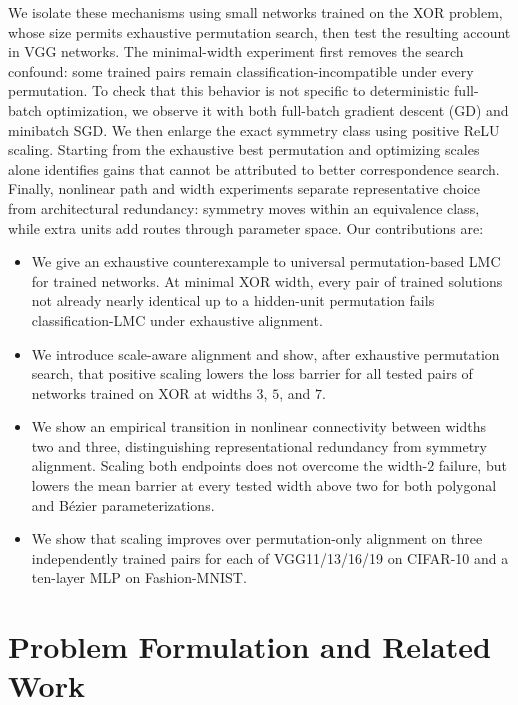 \documentclass[twoside]{article}
\begin{document}
\newpage
We isolate these mechanisms using small networks trained on the XOR problem,
whose size permits exhaustive permutation search, then test the resulting
account in VGG networks.  The
minimal-width experiment first removes the search confound: some trained pairs
remain classification-incompatible under every permutation.  To check that
this behavior is not specific to deterministic full-batch optimization, we
observe it with both full-batch gradient descent (GD) and minibatch SGD.  We then
enlarge the exact symmetry class using positive ReLU scaling.  Starting from
the exhaustive best permutation and optimizing scales alone identifies gains
that cannot be attributed to better correspondence search.  Finally, nonlinear
path and width experiments separate representative choice from architectural
redundancy: symmetry moves within an equivalence class, while extra units add
routes through parameter space.
Our contributions are:
\begin{itemize}
    \item We give an exhaustive counterexample to universal permutation-based
    LMC for trained networks.  At minimal XOR width, every pair of trained
    solutions not already nearly identical up to a hidden-unit permutation
    fails classification-LMC under exhaustive alignment.
    \item We introduce scale-aware alignment and show, after exhaustive
    permutation search, that positive scaling lowers the loss barrier for all
    tested pairs of networks trained on XOR at widths $3$, $5$, and $7$.
    \item We show an empirical transition in nonlinear connectivity between
    widths two and three, distinguishing representational redundancy from
    symmetry alignment.  Scaling both endpoints does not overcome the
    width-$2$ failure, but lowers the mean barrier at every tested width above
    two for both polygonal and B\'ezier parameterizations.
    \item We show that scaling improves over permutation-only alignment on
    three independently trained pairs for each of VGG11/13/16/19 on
    CIFAR-10 and a ten-layer MLP on Fashion-MNIST.
\end{itemize}

\section{Problem Formulation and Related Work}
\label{sec:problem}
\end{document}
